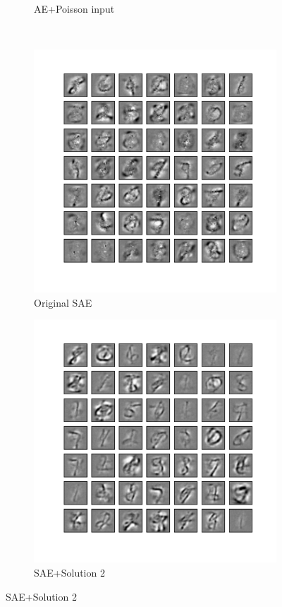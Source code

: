 \begin{figure}
\begin{subfigure}[t]{0.4\textwidth}
		\caption{AE+Poisson input}
	\end{subfigure}\\
	\begin{subfigure}[t]{0.4\textwidth}
		\includegraphics[width=\textwidth]{pics_sdlm/40_MNIST_SAE_original/2_60000_0.pdf}
		\caption{Original SAE}
	\end{subfigure}
	\begin{subfigure}[t]{0.4\textwidth}
		\includegraphics[width=\textwidth]{pics_sdlm/42_MNIST_SAE_noise/2_60000_0.pdf}
		\caption{SAE+Solution 2}
		

\end{subfigure}
\end{figure}
